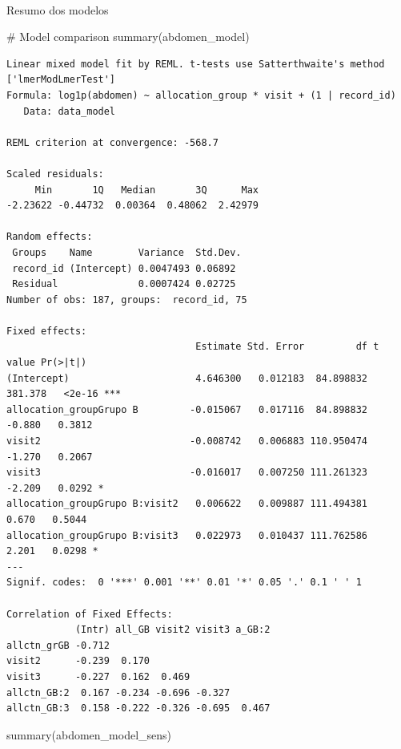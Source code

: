 \documentclass[
  12pt,
]{article}
\makeatletter
\let\oldparagraph\paragraph
\renewcommand{\paragraph}{
    \@ifstar
      \xxxParagraphStar
      \xxxParagraphNoStar
  }
\newcommand{\xxxParagraphStar}[1]{\oldparagraph*{#1}\mbox{}}
\newcommand{\xxxParagraphNoStar}[1]{\oldparagraph{#1}\mbox{}}
\newenvironment{Shaded}{\begin{snugshade}}{\end{snugshade}}
\newcommand{\CommentTok}[1]{\textcolor[rgb]{0.37,0.37,0.37}{#1}}
\newcommand{\FunctionTok}[1]{\textcolor[rgb]{0.28,0.35,0.67}{#1}}
\newcommand{\NormalTok}[1]{\textcolor[rgb]{0.00,0.23,0.31}{#1}}
\makeatother
\begin{document}
\paragraph{Resumo dos modelos}\label{resumo-dos-modelos-13}

\begin{Shaded}
\begin{Highlighting}[]
\CommentTok{\# Model comparison}
\FunctionTok{summary}\NormalTok{(abdomen\_model)}
\end{Highlighting}
\end{Shaded}

\begin{verbatim}
Linear mixed model fit by REML. t-tests use Satterthwaite's method ['lmerModLmerTest']
Formula: log1p(abdomen) ~ allocation_group * visit + (1 | record_id)
   Data: data_model

REML criterion at convergence: -568.7

Scaled residuals: 
     Min       1Q   Median       3Q      Max 
-2.23622 -0.44732  0.00364  0.48062  2.42979 

Random effects:
 Groups    Name        Variance  Std.Dev.
 record_id (Intercept) 0.0047493 0.06892 
 Residual              0.0007424 0.02725 
Number of obs: 187, groups:  record_id, 75

Fixed effects:
                                 Estimate Std. Error         df t value Pr(>|t|)    
(Intercept)                      4.646300   0.012183  84.898832 381.378   <2e-16 ***
allocation_groupGrupo B         -0.015067   0.017116  84.898832  -0.880   0.3812    
visit2                          -0.008742   0.006883 110.950474  -1.270   0.2067    
visit3                          -0.016017   0.007250 111.261323  -2.209   0.0292 *  
allocation_groupGrupo B:visit2   0.006622   0.009887 111.494381   0.670   0.5044    
allocation_groupGrupo B:visit3   0.022973   0.010437 111.762586   2.201   0.0298 *  
---
Signif. codes:  0 '***' 0.001 '**' 0.01 '*' 0.05 '.' 0.1 ' ' 1

Correlation of Fixed Effects:
            (Intr) all_GB visit2 visit3 a_GB:2
allctn_grGB -0.712                            
visit2      -0.239  0.170                     
visit3      -0.227  0.162  0.469              
allctn_GB:2  0.167 -0.234 -0.696 -0.327       
allctn_GB:3  0.158 -0.222 -0.326 -0.695  0.467
\end{verbatim}

\begin{Shaded}
\begin{Highlighting}[]
\FunctionTok{summary}\NormalTok{(abdomen\_model\_sens)}
\end{Highlighting}
\end{Shaded}
\end{document}
